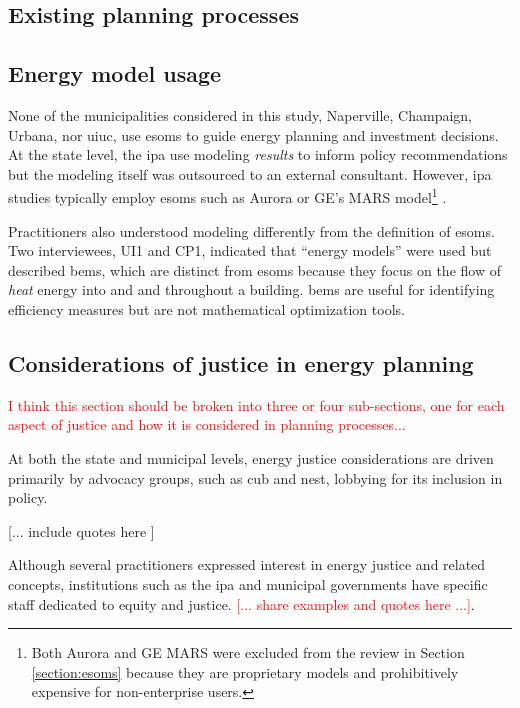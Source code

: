 \subsection{Existing planning processes}
\subsection{Energy model usage}

None of the municipalities considered in this study, Naperville, Champaign,
Urbana, nor \ac{uiuc}, use \acp{esom} to guide energy planning and investment
decisions. At the state level, the \ac{ipa} use modeling \textit{results} to
inform policy recommendations but the modeling itself was outsourced to an
external consultant. However, \ac{ipa} studies typically employ \acp{esom} such
as Aurora or GE's MARS model\footnote{Both Aurora and GE MARS were excluded from
the review in Section \ref{section:esoms} because they are proprietary models
and prohibitively expensive for non-enterprise users.}
\cite{bringolf_evaluation_2024, carlson_illinois_2024}.

Practitioners also understood modeling differently from the definition of
\acp{esom}. Two interviewees, UI1 and CP1, indicated that ``energy models'' were
used but described \acp{bem}, which are distinct from \acp{esom} because they
focus on the flow of \textit{heat} energy into and and throughout a building.
\acp{bem} are useful for identifying efficiency measures but are not
mathematical optimization tools.


\subsection{Considerations of justice in energy planning}
\textcolor{red}{I think this section should be broken into three or four
sub-sections, one for each aspect of justice and how it is considered in
planning processes...}

At both the state and municipal levels, energy justice considerations are driven
primarily by advocacy groups, such as \ac{cub} and \ac{nest}, lobbying for its
inclusion in policy. 

[... include quotes here ]

Although several practitioners expressed interest in energy justice and related
concepts, institutions such as the \ac{ipa} and municipal governments have
specific staff dedicated to equity and justice. \textcolor{red}{[... share
examples and quotes here ...]}. 

